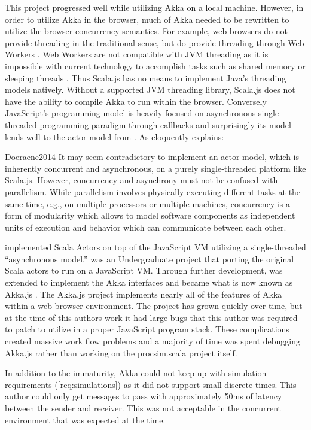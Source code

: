 This project progressed well while utilizing Akka on a local machine. However, in order to utilize Akka in the browser, much of Akka needed to be rewritten to utilize the browser concurrency semantics. For example, web browsers do not provide threading in the traditional sense, but do provide threading through Web Workers \cite{MDNWebWorkers}. Web Workers are not compatible with JVM threading as it is impossible with current technology to accomplish tasks such as shared memory or sleeping threads \cite{Doeraene2017}. Thus Scala.js has no means to implement Java's threading models natively. Without a supported JVM threading library, Scala.js does not have the ability to compile Akka to run within the browser. Conversely JavaScript's programming model is heavily focused on asynchronous single-threaded programming paradigm through callbacks and surprisingly its model lends well to the actor model from \cite{Agha1985}. As \cite{Doeraene2014} eloquently explains:
\begin{displaycquote}{Doeraene2014}
    It may seem contradictory to implement an actor model, which is inherently concurrent and asynchronous,
    on a purely single-threaded platform like Scala.js. However, concurrency and asynchrony must not be confused with parallelism. While parallelism involves physically executing different tasks at the same time, e.g., on multiple processors or multiple machines, concurrency is a form of modularity which allows to model software components as independent units of execution and behavior which can communicate between each other.
\end{displaycquote}
\cite{Doeraene2014} implemented Scala Actors on top of the JavaScript VM utilizing a single-threaded ``asynchronous model.'' \cite{Doeraene2014} was an Undergraduate project that porting the original Scala actors to run on a JavaScript VM. Through further development, \cite{Doeraene2014} was extended to implement the Akka interfaces and became what is now known as Akka.js \cite{Stivan2015, akka-js2015}. The Akka.js project implements nearly all of the features of Akka within a web browser environment. The project has grown quickly over time, but at the time of this authors work it had large bugs that this author was required to patch to utilize in a proper JavaScript program stack. These complications created massive work flow problems and a majority of time was spent debugging Akka.js rather than working on the procsim.scala project itself.

In addition to the immaturity, Akka could not keep up with simulation requirements (\cref{req:simulations}) as it did not support small discrete times. This author could only get messages to pass with approximately 50ms of latency between the sender and receiver. This was not acceptable in the concurrent environment that was expected at the time. 


